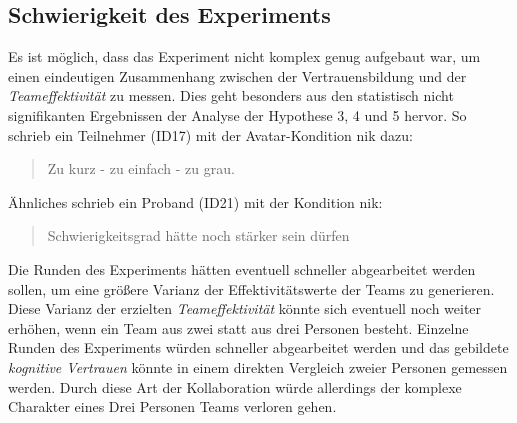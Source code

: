 \documentclass[a4paper,11pt]{article}%
\renewcommand{\\}{\vspace*{0.5\baselineskip} \newline}
\begin{document}
{{\subsection{Schwierigkeit des Experiments}
\label{Schwierigkeit des Experiments}

Es ist möglich, dass das Experiment nicht komplex genug aufgebaut war, um einen eindeutigen Zusammenhang zwischen der Vertrauensbildung und der \textit{Teameffektivität} zu messen. Dies geht besonders aus den statistisch nicht signifikanten Ergebnissen der Analyse der Hypothese 3, 4 und 5 hervor. So schrieb ein Teilnehmer (ID17) mit der Avatar-Kondition \ac{nik} dazu:
\begin{quote}
\glqq{}Zu kurz - zu einfach - zu grau.\dq{}
\end{quote}
Ähnliches schrieb ein Proband (ID21) mit der Kondition \ac{nik}:
\begin{quote}
\glqq{}Schwierigkeitsgrad hätte noch stärker sein dürfen\dq{}
\end{quote}
Die Runden des Experiments hätten eventuell schneller abgearbeitet werden sollen, um eine größere Varianz der Effektivitätswerte der Teams zu generieren. Diese Varianz der erzielten \textit{Teameffektivität} könnte sich eventuell noch weiter erhöhen, wenn ein Team aus zwei statt aus drei Personen besteht. Einzelne Runden des Experiments würden schneller abgearbeitet werden und das gebildete \textit{kognitive Vertrauen} könnte in einem direkten Vergleich zweier Personen gemessen werden. Durch diese Art der Kollaboration würde allerdings der komplexe Charakter eines Drei Personen Teams verloren gehen.

}}
\end{document}
